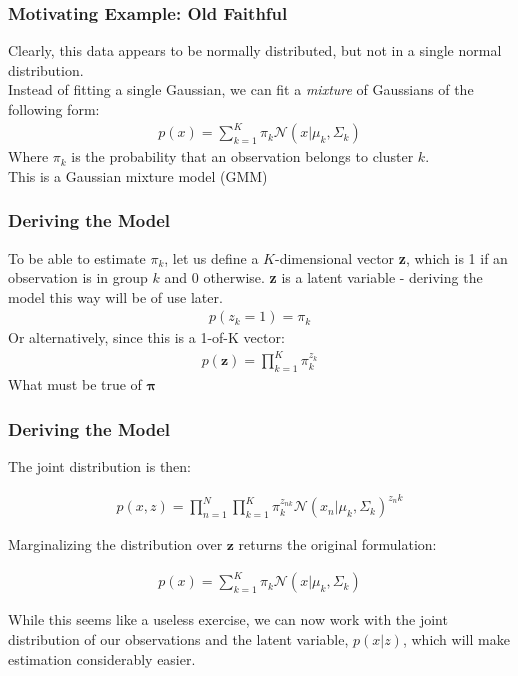 \documentclass{beamer}
\begin{document}
\begin{frame}
\frametitle{Motivating Example: Old Faithful}
Clearly, this data appears to be normally distributed, but not in a single normal distribution.\\
Instead of fitting a single Gaussian, we can fit a \textit{mixture} of Gaussians of the following form:
\begin{align*}
p(x) = \sum_{k=1}^{K} \pi_k \mathcal{N} (x | \mu_k, \Sigma_k)
\end{align*}
Where $\pi_k$ is the probability that an observation belongs to cluster $k$. \\
This is a Gaussian mixture model (GMM)
\end{frame}

\begin{frame}
\frametitle{Deriving the Model}
	To be able to estimate $\pi_k$, let us define a $K$-dimensional vector \textbf{z}, which is 1 if an observation is in group $k$ and 0 otherwise. \textbf{z} is a latent variable - deriving the model this way will be of use later.\\
	\begin{align*}
	p(z_k = 1) = \pi_k
	\end{align*}
	Or alternatively, since this is a 1-of-K vector:
	\begin{align*}
	p(\mathbf{z})  = \prod_{k = 1}^{K} \pi_k^{z_k}
	\end{align*}
	What must be true of $\mathbf{\pi}$

\end{frame}

 \begin{frame}
 \frametitle{Deriving the Model}
 
 	The joint distribution is then:

 	\begin{align*}
 	p(x,z) = \prod_{n = 1}^{N} \prod_{k = 1}^{K} \pi_k^{z_{nk}} \mathcal{N}(x_n | \mu_k, \Sigma_k)^{z_nk}
 	\end{align*}
 	
 	Marginalizing the distribution over $\mathbf{z}$ returns the original formulation:
 	
 	\begin{align*}
 	p(x) = \sum_{k=1}^{K} \pi_k \mathcal{N} (x | \mu_k, \Sigma_k)
 	\end{align*}
 	
 	While this seems like a useless exercise, we can now work with the joint distribution of our observations and the latent variable, $p(x|z)$, which will make estimation considerably easier.
 
 \end{frame}
\end{document}
